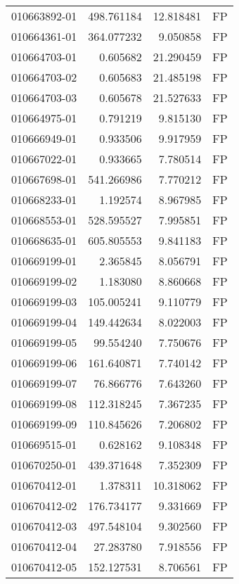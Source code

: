 \begin{tabular}{lrrl}
010663892-01 &  498.761184 &      12.818481 &   FP \\
010664361-01 &  364.077232 &       9.050858 &   FP \\
010664703-01 &    0.605682 &      21.290459 &   FP \\
010664703-02 &    0.605683 &      21.485198 &   FP \\
010664703-03 &    0.605678 &      21.527633 &   FP \\
010664975-01 &    0.791219 &       9.815130 &   FP \\
010666949-01 &    0.933506 &       9.917959 &   FP \\
010667022-01 &    0.933665 &       7.780514 &   FP \\
010667698-01 &  541.266986 &       7.770212 &   FP \\
010668233-01 &    1.192574 &       8.967985 &   FP \\
010668553-01 &  528.595527 &       7.995851 &   FP \\
010668635-01 &  605.805553 &       9.841183 &   FP \\
010669199-01 &    2.365845 &       8.056791 &   FP \\
010669199-02 &    1.183080 &       8.860668 &   FP \\
010669199-03 &  105.005241 &       9.110779 &   FP \\
010669199-04 &  149.442634 &       8.022003 &   FP \\
010669199-05 &   99.554240 &       7.750676 &   FP \\
010669199-06 &  161.640871 &       7.740142 &   FP \\
010669199-07 &   76.866776 &       7.643260 &   FP \\
010669199-08 &  112.318245 &       7.367235 &   FP \\
010669199-09 &  110.845626 &       7.206802 &   FP \\
010669515-01 &    0.628162 &       9.108348 &   FP \\
010670250-01 &  439.371648 &       7.352309 &   FP \\
010670412-01 &    1.378311 &      10.318062 &   FP \\
010670412-02 &  176.734177 &       9.331669 &   FP \\
010670412-03 &  497.548104 &       9.302560 &   FP \\
010670412-04 &   27.283780 &       7.918556 &   FP \\
010670412-05 &  152.127531 &       8.706561 &   FP \\

\end{tabular}

